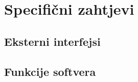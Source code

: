 \chapter{Specifični zahtjevi}
\label{poglavlje3}
\section{Eksterni interfejsi}
\section{Funkcije softvera}
